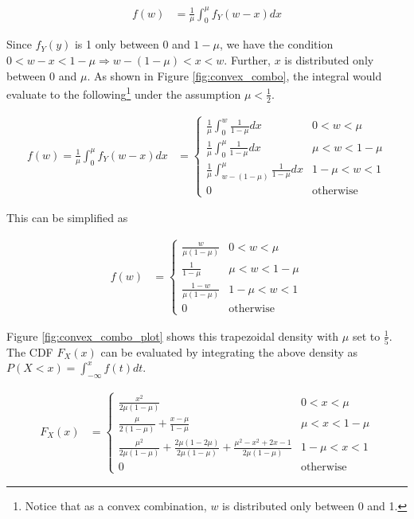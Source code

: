 \documentclass[
    oneside,
    fontsize=10pt,leqno]{article}
\begin{document}
\begin{align*}
f(w) & =\frac{1}{\mu}\int_{0}^{\mu}f_{Y}(w-x)dx
\end{align*}

Since $f_{Y}(y)$ is 1 only between 0 and $1-\mu$, we have the condition
$0<w-x<1-\mu\Rightarrow w-(1-\mu)<x<w$. Further, $x$ is distributed
only between 0 and $\mu$. As shown in Figure \ref{fig:convex_combo},
the integral would evaluate to the following\footnote{Notice that as a convex combination, $w$ is distributed only between
0 and 1.} under the assumption $\mu<\frac{1}{2}$.

\begin{align*}
f(w)=\frac{1}{\mu}\int_{0}^{\mu}f_{Y}(w-x)dx & =\begin{cases}
\frac{1}{\mu}\int_{0}^{w}\frac{1}{1-\mu}dx & 0<w<\mu\\
\frac{1}{\mu}\int_{0}^{\mu}\frac{1}{1-\mu}dx & \mu<w<1-\mu\\
\frac{1}{\mu}\int_{w-(1-\mu)}^{\mu}\frac{1}{1-\mu}dx & 1-\mu<w<1\\
0 & \text{otherwise}
\end{cases}
\end{align*}

This can be simplified as 

\begin{align*}
f(w) & =\begin{cases}
\frac{w}{\mu(1-\mu)} & 0<w<\mu\\
\frac{1}{1-\mu} & \mu<w<1-\mu\\
\frac{1-w}{\mu(1-\mu)} & 1-\mu<w<1\\
0 & \text{otherwise}
\end{cases}
\end{align*}

Figure \ref{fig:convex_combo_plot} shows this trapezoidal density
with $\mu$ set to $\frac{1}{5}$. The CDF $F_{X}(x)$ can be evaluated
by integrating the above density as $P(X<x)=\int_{-\infty}^{x}f(t)dt$. 

\begin{align*}
F_{X}(x) & =\begin{cases}
\frac{x^{2}}{2\mu(1-\mu)} & 0<x<\mu\\
\frac{\mu}{2(1-\mu)}+\frac{x-\mu}{1-\mu} & \mu<x<1-\mu\\
\frac{\mu^{2}}{2\mu(1-\mu)}+\frac{2\mu(1-2\mu)}{2\mu(1-\mu)}+\frac{\mu^{2}-x^{2}+2x-1}{2\mu(1-\mu)} & 1-\mu<x<1\\
0 & \text{otherwise}
\end{cases}
\end{align*}
\end{document}

